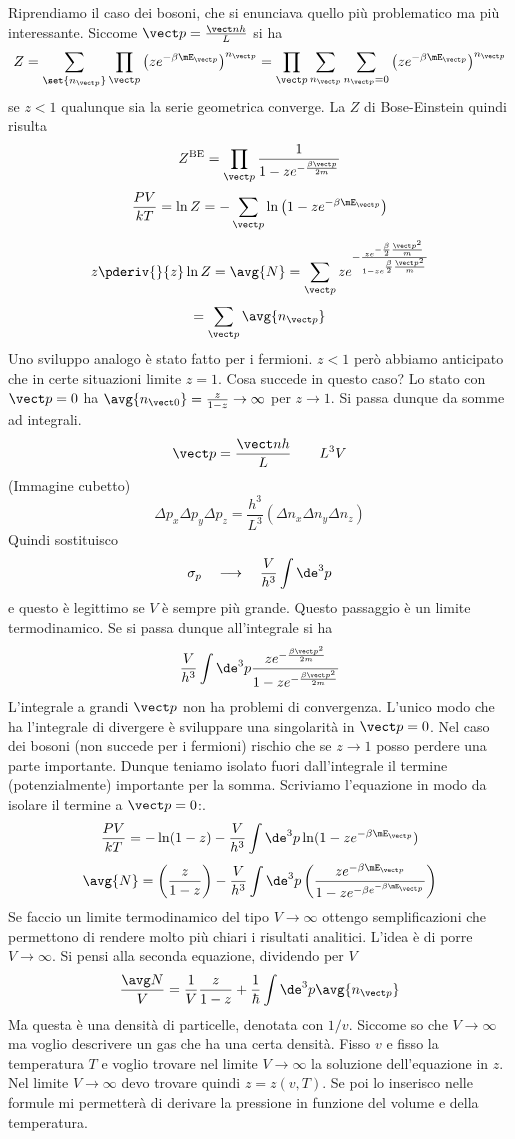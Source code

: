 Riprendiamo il caso dei bosoni, che si enunciava quello più problematico ma più interessante. Siccome $\vect p = \frac{\vect n h}{L}$ si ha
\[
Z = \sum_{\set{n_{\vect p}}} \prod_{\vect p} \left(z e^{-\beta \mE_{\vect p}}\right)^{n_{\vect p}} = \prod_{\vect p} \sum_{n_{\vect p}} \sum_{n_{\vect p} = 0} \left(z e^{-\beta \mE_{\vect p}}\right)^{n_{\vect p}}
\]
se $z < 1$ qualunque sia la serie geometrica converge. La $Z$ di Bose-Einstein quindi risulta
\[
Z^{\text{BE}} = \prod_{\vect p} \frac{1}{1 - z e^{-\frac{\beta \vect p}{2m}}}
\]
\[
\frac{PV}{kT} = \ln Z = - \sum_{\vect p} \ln\left(1 - z e^{-\beta \mE_{\vect p}}\right)
\]
\[
z \pderiv{}{z} \ln Z = \avg{N} = \sum_{\vect p} z e^{-\frac{z e^{-\frac{\beta}{2} \frac{\vect p^2}{m}}}{1 - z e^{\frac{\beta}{2} \frac{\vect p^2}{m}}}}
\]
\[
= \sum_{\vect p} \avg{n_{\vect p}}
\]
Uno sviluppo analogo è stato fatto per i fermioni. $z < 1$ però abbiamo anticipato che in certe situazioni limite $z = 1$. Cosa succede in questo caso? Lo stato con $\vect p = 0$ ha $\avg{n_{\vect 0}} = \frac{z}{1 - z} \to \infty$ per $z \to 1$. Si passa dunque da somme ad integrali.
\[
\vect p = \frac{\vect n h}{L} \qquad L^3 V
\]
(Immagine cubetto)
\[
\Delta p_x \Delta p_y \Delta p_z = \frac{h^3}{L^3} (\Delta n_x \Delta n_y \Delta n_z)
\]
Quindi sostituisco
\[
\sigma_p \quad \longrightarrow \quad \frac{V}{h^3} \int \de^3 p
\]
e questo è legittimo se $V$ è sempre più grande. Questo passaggio è un limite termodinamico. Se si passa dunque all'integrale si ha
\[
\frac{V}{h^3} \int \de^3 p \frac{z e^{-\frac{\beta \vect p^2}{2 m}}}{1 - z e^{-\frac{\beta \vect p^2}{2m}}}
\]
L'integrale a grandi $\vect p$ non ha problemi di convergenza. L'unico modo che ha l'integrale di divergere è sviluppare una singolarità in $\vect p = 0$. Nel caso dei bosoni (non succede per i fermioni) rischio che se $z \to 1$ posso perdere una parte importante. Dunque teniamo isolato fuori dall'integrale il termine (potenzialmente) importante per la somma. Scriviamo l'equazione in modo da isolare il termine a $\vect p = 0$:.
\[
\frac{P V}{k T} = - \ln(1 - z) - \frac{V}{h^3} \int \de^3 p \ln(1 - z e^{-\beta \mE_{\vect p}})
\]
\[
\avg{N} = \left(\frac{z}{1 - z}\right) - \frac{V}{h^3} \int \de^3 p \left(\frac{z e^{- \beta \mE_{\vect p}}}{1 - z e^{- \beta e^{-\beta \mE_{\vect p}}}}\right)
\]
Se faccio un limite termodinamico del tipo $V \to \infty$ ottengo semplificazioni che permettono di rendere molto più chiari i risultati analitici. L'idea è di porre $V \to \infty$. Si pensi alla seconda equazione, dividendo per $V$
\[
\frac{\avg N}{V} = \frac{1}{V} \frac{z}{1 - z} + \frac{1}{\hbar} \int \de^3 p \avg{n_{\vect p}}
\]
Ma questa è una densità di particelle, denotata con $1/v$. Siccome so che $V \to \infty$ ma voglio descrivere un gas che ha una certa densità. Fisso $v$ e fisso la temperatura $T$ e voglio trovare nel limite $V \to \infty$ la soluzione dell'equazione in $z$. Nel limite $V \to \infty$ devo trovare quindi $z = z(v,T)$. Se poi lo inserisco nelle formule mi permetterà di derivare la pressione in funzione del volume e della temperatura.

